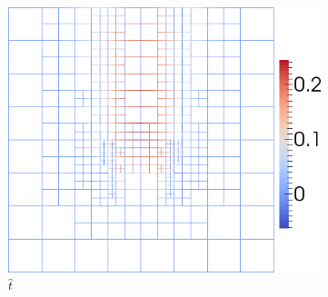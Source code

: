 \documentclass[18pt,xcolor=table]{beamer}
\begin{document}
\begin{frame}[t]
\begin{columns}[t]
\begin{column}[c]{0.7\textwidth}
\begin{figure}[ht]
\begin{subfigure}[t]{0.45\textwidth}
\centering
\includegraphics[height=0.8\textwidth]{SpaceTimeHeat/PulseSource/fhat.png}
\\$\hat t$
\end{subfigure}
\end{figure}
\end{column}
\end{columns}
\end{frame}
\begin{comment}
Here we have a very contrived example problem. 
We start with a completely zero initial condition and then turn on a unit source from t = 1/4 to t=1/2,
then watch the inputted heat diffuse over the rest of the time interval.
The key thing to watch for is making sure we don't get any heat bleeding backwards in time. 
Indeed we get  very clean start at t=1/4.
Notice also how u hat exists only on vertical boundaries, while the flux lives on the entire mesh skeleton.
We also see how the method naturally picks on on areas of rapid temporal or spatial changes and adapts to resolve them.
\end{comment}
\end{document}
